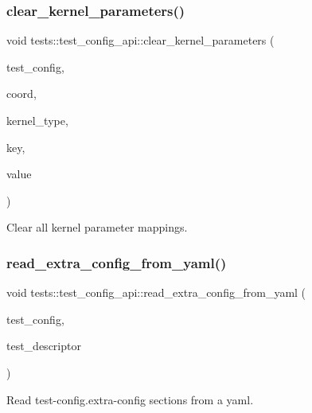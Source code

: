 \subsubsection{\texorpdfstring{clear\+\_\+kernel\+\_\+parameters()}{clear\_kernel\_parameters()}}
{\footnotesize\ttfamily void tests\+::test\+\_\+config\+\_\+api\+::clear\+\_\+kernel\+\_\+parameters (\begin{DoxyParamCaption}\item[{\hyperlink{structtests_1_1TestConfig}{Test\+Config} \&}]{test\+\_\+config,  }\item[{\hyperlink{structllk_1_1xy__pair}{llk\+::xy\+\_\+pair}}]{coord,  }\item[{\hyperlink{namespacetests_a4f360b8af533762256ff97513bfd6a0d}{tests\+::\+Kernel\+Type}}]{kernel\+\_\+type,  }\item[{std\+::string}]{key,  }\item[{std\+::string}]{value }\end{DoxyParamCaption})}



Clear all kernel parameter mappings. 

\mbox{\label{namespacetests_1_1test__config__api_a535396ca6d07ebe33c1232eda6bded29}} 
\subsubsection{\texorpdfstring{read\+\_\+extra\+\_\+config\+\_\+from\+\_\+yaml()}{read\_extra\_config\_from\_yaml()}}
{\footnotesize\ttfamily void tests\+::test\+\_\+config\+\_\+api\+::read\+\_\+extra\+\_\+config\+\_\+from\+\_\+yaml (\begin{DoxyParamCaption}\item[{\hyperlink{structtests_1_1TestConfig}{Test\+Config} \&}]{test\+\_\+config,  }\item[{Y\+A\+M\+L\+::\+Node \&}]{test\+\_\+descriptor }\end{DoxyParamCaption})}



Read test-\/config.\+extra-\/config sections from a yaml. 

